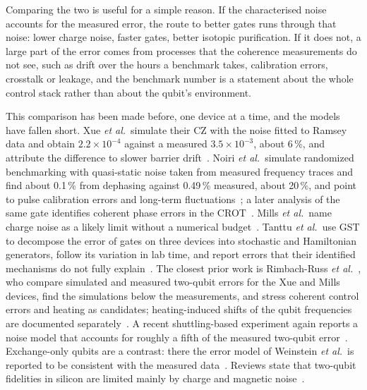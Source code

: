 \documentclass[reprint,aps,pra,floatfix,superscriptaddress,longbibliography,nofootinbib]{revtex4-2}
\newcommand{\ee}[2]{#1\times10^{#2}}
\begin{document}
Comparing the two is useful for a simple reason. If the characterised noise accounts for the measured error, the route to better gates runs through that noise: lower charge noise, faster gates, better isotopic purification. If it does not, a large part of the error comes from processes that the coherence measurements do not see, such as drift over the hours a benchmark takes, calibration errors, crosstalk or leakage, and the benchmark number is a statement about the whole control stack rather than about the qubit's environment.

This comparison has been made before, one device at a time, and the models have fallen short. Xue \emph{et al.}\ simulate their CZ with the noise fitted to Ramsey data and obtain $\ee{2.2}{-4}$ against a measured $\ee{3.5}{-3}$, about 6\,\%, and attribute the difference to slower barrier drift~\cite{xue2022}. Noiri \emph{et al.}\ simulate randomized benchmarking with quasi-static noise taken from measured frequency traces and find about 0.1\,\% from dephasing against 0.49\,\% measured, about 20\,\%, and point to pulse calibration errors and long-term fluctuations~\cite{noiri2022}; a later analysis of the same gate identifies coherent phase errors in the CROT~\cite{wu2024}. Mills \emph{et al.}\ name charge noise as a likely limit without a numerical budget~\cite{mills2022}. Tanttu \emph{et al.}\ use GST to decompose the error of gates on three devices into stochastic and Hamiltonian generators, follow its variation in lab time, and report errors that their identified mechanisms do not fully explain~\cite{tanttu2024}. The closest prior work is Rimbach-Russ \emph{et al.}~\cite{rimbachruss2023}, who compare simulated and measured two-qubit errors for the Xue and Mills devices, find the simulations below the measurements, and stress coherent control errors and heating as candidates; heating-induced shifts of the qubit frequencies are documented separately~\cite{undseth2023}. A recent shuttling-based experiment again reports a noise model that accounts for roughly a fifth of the measured two-qubit error~\cite{matsumoto2026}. Exchange-only qubits are a contrast: there the error model of Weinstein \emph{et al.}\ is reported to be consistent with the measured data~\cite{weinstein2023}. Reviews state that two-qubit fidelities in silicon are limited mainly by charge and magnetic noise~\cite{burkard2023}.
\end{document}
